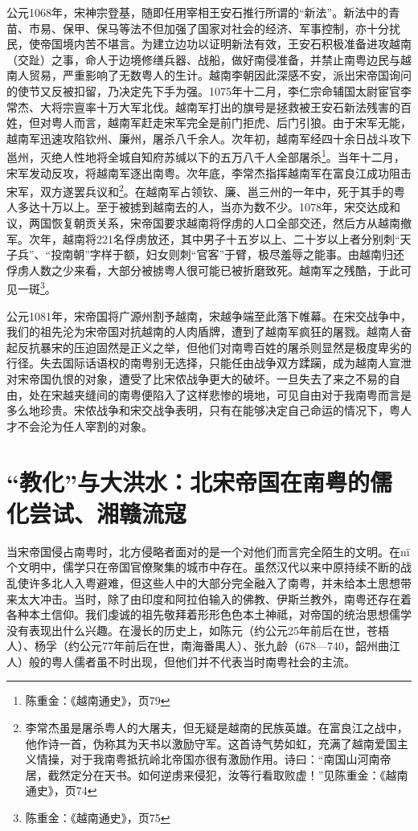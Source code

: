 公元1068年，宋神宗登基，随即任用宰相王安石推行所谓的“新法”。新法中的青苗、市易、保甲、保马等法不但加强了国家对社会的经济、军事控制，亦十分扰民，使帝国境内苦不堪言。为建立边功以证明新法有效，王安石积极准备进攻越南（交趾）之事，命人于边境修缮兵器、战船，做好南侵准备，并禁止南粤边民与越南人贸易，严重影响了无数粤人的生计。越南李朝因此深感不安，派出宋帝国询问的使节又反被扣留，乃决定先下手为强。1075年十二月，李仁宗命辅国太尉宦官李常杰、大将宗亶率十万大军北伐。越南军打出的旗号是拯救被王安石新法残害的百姓，但对粤人而言，越南军赶走宋军完全是前门拒虎、后门引狼。由于宋军无能，越南军迅速攻陷钦州、廉州，屠杀八千余人。次年初，越南军经四十余日战斗攻下邕州，灭绝人性地将全城自知府苏缄以下的五万八千人全部屠杀\footnote{陈重金：《越南通史》，页79}。当年十二月，宋军发动反攻，将越南军逐出南粤。次年底，李常杰指挥越南军在富良江成功阻击宋军，双方遂罢兵议和\footnote{李常杰虽是屠杀粤人的大屠夫，但无疑是越南的民族英雄。在富良江之战中，他作诗一首，伪称其为天书以激励守军。这首诗气势如虹，充满了越南爱国主义情操，对于我南粤抵抗岭北帝国亦很有激励作用。诗曰：“南国山河南帝居，截然定分在天书。如何逆虏来侵犯，汝等行看取败虚！”见陈重金：《越南通史》，页74}。在越南军占领钦、廉、邕三州的一年中，死于其手的粤人多达十万以上。至于被掳到越南去的人，当亦为数不少。1078年，宋交达成和议，两国恢复朝贡关系，宋帝国要求越南将俘虏的人口全部交还，然后方从越南撤军。次年，越南将221名俘虏放还，其中男子十五岁以上、二十岁以上者分别刺“天子兵”、“投南朝”字样于额，妇女则刺“官客”于臂，极尽羞辱之能事。由越南归还俘虏人数之少来看，大部分被掳粤人很可能已被折磨致死。越南军之残酷，于此可见一斑\footnote{陈重金：《越南通史》，页75}。

公元1081年，宋帝国将广源州割予越南，宋越争端至此落下帷幕。在宋交战争中，我们的祖先沦为宋帝国对抗越南的人肉盾牌，遭到了越南军疯狂的屠戮。越南人奋起反抗暴宋的压迫固然是正义之举，但他们对南粤百姓的屠杀则显然是极度卑劣的行径。失去国际话语权的南粤别无选择，只能任由战争双方蹂躏，成为越南人宣泄对宋帝国仇恨的对象，遭受了比宋侬战争更大的破坏。一旦失去了来之不易的自由，处在宋越夹缝间的南粤便陷入了这样悲惨的境地，可见自由对于我南粤而言是多么地珍贵。宋侬战争和宋交战争表明，只有在能够决定自己命运的情况下，粤人才不会沦为任人宰割的对象。

\section{“教化”与大洪水：北宋帝国在南粤的儒化尝试、湘赣流寇}

\indent 当宋帝国侵占南粤时，北方侵略者面对的是一个对他们而言完全陌生的文明。在nï 个文明中，儒学只在帝国官僚聚集的城市中存在。虽然汉代以来中原持续不断的战乱使许多北人入粤避难，但这些人中的大部分完全融入了南粤，并未给本土思想带来太大冲击。当时，除了由印度和阿拉伯输入的佛教、伊斯兰教外，南粤还存在着各种本土信仰。我们虔诚的祖先敬拜着形形色色本土神祗，对帝国的统治思想儒学没有表现出什么兴趣。在漫长的历史上，如陈元（约公元25年前后在世，苍梧人）、杨孚（约公元77年前后在世，南海番禺人）、张九龄（678—740，韶州曲江人）般的粤人儒者虽不时出现，但他们并不代表当时南粤社会的主流。

